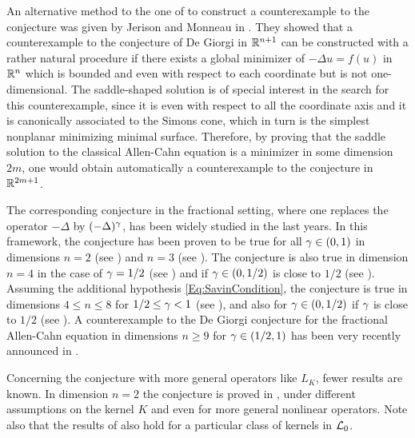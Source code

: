 An alternative method to the one of \cite{delPinoKowalczykWei} to construct a counterexample to the conjecture was given by Jerison and Monneau in \cite{JerisonMonneau}. They showed that a counterexample to the conjecture of De Giorgi in $\mathbb{R}^{n+1}$ can be constructed with a rather natural procedure if there exists a global minimizer of $-\Delta u = f(u)$ in $\mathbb{R}^n$ which is bounded and even with respect to each coordinate but is not one-dimensional. The saddle-shaped solution is of special interest in the search for this counterexample, since it is even with respect to all the coordinate axis and it is canonically associated to the Simons cone, which in turn is the simplest nonplanar minimizing minimal surface. Therefore, by proving that the saddle solution to the classical Allen-Cahn equation is a minimizer in some dimension $2m$, one would obtain automatically a counterexample to the conjecture in $\mathbb{R}^{2m+1}$.

The corresponding conjecture in the fractional setting, where one replaces the operator $-\Delta$ by $(-\Delta)^\gamma$, has been widely studied in the last years. In this framework, the conjecture has been proven to be true for all $\gamma\in(0,1)$ in dimensions $n=2$ (see \cite{CabreSolaMorales,CabreSireI,SireValdinoci}) and $n=3$ (see \cite{CabreCinti-EnergyHalfL, CabreCinti-SharpEnergy,DipierroFarinaValdinoci}). The conjecture is also true in dimension $n=4$ in the case of $\gamma = 1/2$ (see \cite{FigalliSerra}) and if $\gamma\in(0,1/2)$ is close to $1/2$ (see \cite{CabreCintiSerra-Stable}). Assuming the additional hypothesis \eqref{Eq:SavinCondition}, the conjecture is true in dimensions $4\leq n \leq 8$ for $1/2 \leq \gamma < 1$ (see \cite{Savin-Fractional,Savin-Fractional2}), and also for $\gamma\in(0,1/2)$ if $\gamma$ is close to $1/2$ (see \cite{DipierroSerraValdinoci}). A counterexample to the De Giorgi conjecture for the fractional Allen-Cahn equation in dimensions $n \geq 9$ for $\gamma \in (1/2,1)$ has been very recently announced in \cite{ChanLiuWei}.

Concerning the conjecture with more general operators like $L_K$, fewer results are known. In dimension $n=2$ the conjecture is proved in \cite{HamelRosOtonSireValdinoci, Bucur, FazlySire}, under different assumptions on the kernel $K$ and even for more general nonlinear operators. Note also that the results of \cite{DipierroSerraValdinoci} also hold for a particular class of kernels in $\mathcal{L}_0$.



